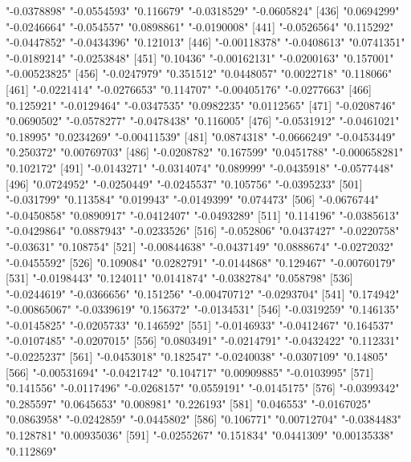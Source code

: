 \begin{Schunk}
\begin{Soutput}
[431] "-0.0378898"   "-0.0554593"   "0.116679"     "-0.0318529"   "-0.0605824"  
[436] "0.0694299"    "-0.0246664"   "-0.054557"    "0.0898861"    "-0.0190008"  
[441] "-0.0526564"   "0.115292"     "-0.0447852"   "-0.0434396"   "0.121013"    
[446] "-0.00118378"  "-0.0408613"   "0.0741351"    "-0.0189214"   "-0.0253848"  
[451] "0.10436"      "-0.00162131"  "-0.0200163"   "0.157001"     "-0.00523825" 
[456] "-0.0247979"   "0.351512"     "0.0448057"    "0.0022718"    "0.118066"    
[461] "-0.0221414"   "-0.0276653"   "0.114707"     "-0.00405176"  "-0.0277663"  
[466] "0.125921"     "-0.0129464"   "-0.0347535"   "0.0982235"    "0.0112565"   
[471] "-0.0208746"   "0.0690502"    "-0.0578277"   "-0.0478438"   "0.116005"    
[476] "-0.0531912"   "-0.0461021"   "0.18995"      "0.0234269"    "-0.00411539" 
[481] "0.0874318"    "-0.0666249"   "-0.0453449"   "0.250372"     "0.00769703"  
[486] "-0.0208782"   "0.167599"     "0.0451788"    "-0.000658281" "0.102172"    
[491] "-0.0143271"   "-0.0314074"   "0.089999"     "-0.0435918"   "-0.0577448"  
[496] "0.0724952"    "-0.0250449"   "-0.0245537"   "0.105756"     "-0.0395233"  
[501] "-0.031799"    "0.113584"     "0.019943"     "-0.0149399"   "0.074473"    
[506] "-0.0676744"   "-0.0450858"   "0.0890917"    "-0.0412407"   "-0.0493289"  
[511] "0.114196"     "-0.0385613"   "-0.0429864"   "0.0887943"    "-0.0233526"  
[516] "-0.052806"    "0.0437427"    "-0.0220758"   "-0.03631"     "0.108754"    
[521] "-0.00844638"  "-0.0437149"   "0.0888674"    "-0.0272032"   "-0.0455592"  
[526] "0.109084"     "0.0282791"    "-0.0144868"   "0.129467"     "-0.00760179" 
[531] "-0.0198443"   "0.124011"     "0.0141874"    "-0.0382784"   "0.058798"    
[536] "-0.0244619"   "-0.0366656"   "0.151256"     "-0.00470712"  "-0.0293704"  
[541] "0.174942"     "-0.00865067"  "-0.0339619"   "0.156372"     "-0.0134531"  
[546] "-0.0319259"   "0.146135"     "-0.0145825"   "-0.0205733"   "0.146592"    
[551] "-0.0146933"   "-0.0412467"   "0.164537"     "-0.0107485"   "-0.0207015"  
[556] "0.0803491"    "-0.0214791"   "-0.0432422"   "0.112331"     "-0.0225237"  
[561] "-0.0453018"   "0.182547"     "-0.0240038"   "-0.0307109"   "0.14805"     
[566] "-0.00531694"  "-0.0421742"   "0.104717"     "0.00909885"   "-0.0103995"  
[571] "0.141556"     "-0.0117496"   "-0.0268157"   "0.0559191"    "-0.0145175"  
[576] "-0.0399342"   "0.285597"     "0.0645653"    "0.008981"     "0.226193"    
[581] "0.046553"     "-0.0167025"   "0.0863958"    "-0.0242859"   "-0.0445802"  
[586] "0.106771"     "0.00712704"   "-0.0384483"   "0.128781"     "0.00935036"  
[591] "-0.0255267"   "0.151834"     "0.0441309"    "0.00135338"   "0.112869"    

\end{Soutput}
\end{Schunk}
